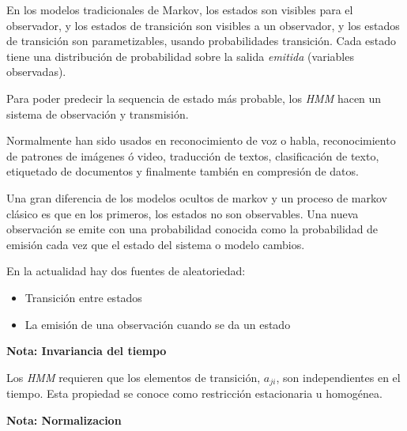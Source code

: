 En los modelos tradicionales de Markov, los estados son visibles para el observador, y los estados de transición son visibles a un observador, y los estados de transición son parametizables, usando probabilidades transición.
Cada estado tiene una distribución de probabilidad sobre la salida \emph{emitida} (variables observadas).

Para poder predecir la sequencia de estado más probable, los \emph{HMM} hacen un sistema de observación y transmisión.







Normalmente han sido usados en reconocimiento de voz o habla, reconocimiento de patrones de imágenes ó video, traducción de textos, clasificación de texto, etiquetado de documentos y finalmente también en compresión de datos.

Una gran diferencia de los modelos ocultos de markov y un proceso de markov clásico es que en los primeros, los estados no son observables.  Una nueva observación se emite con una probabilidad conocida como la probabilidad de emisión cada vez que el estado del sistema o modelo cambios.

En la actualidad hay dos fuentes de aleatoriedad:

\begin{itemize}
	\item Transición entre estados
	\item La emisión de una observación cuando se da un estado
\end{itemize}




\textbf{Nota: Invariancia del tiempo}

Los \textit{HMM} requieren que los elementos de transición, $a_{ji}$, son independientes en el tiempo. Esta propiedad se conoce como restricción estacionaria u homogénea.

\textbf{Nota: Normalizacion}

